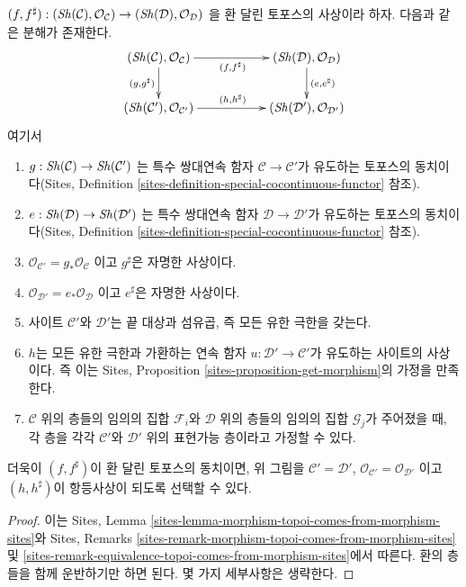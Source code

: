 \begin{lemma}
\label{lemma-morphism-ringed-topoi-comes-from-morphism-ringed-sites}
$(f, f^\sharp) :
(\mathop{\mathit{Sh}}\nolimits(\mathcal{C}), \mathcal{O}_\mathcal{C})
\to (\mathop{\mathit{Sh}}\nolimits(\mathcal{D}), \mathcal{O}_\mathcal{D})$
을 환 달린 토포스의 사상이라 하자. 다음과 같은 분해가 존재한다.
$$
\xymatrix{
(\Sh(\mathcal{C}), \mathcal{O}_\mathcal{C})
\ar[rr]_{(f, f^\sharp)}
\ar[d]_{(g, g^\sharp)}
& &
(\Sh(\mathcal{D}), \mathcal{O}_\mathcal{D}) \ar[d]^{(e, e^\sharp)}
\\
(\Sh(\mathcal{C}'), \mathcal{O}_{\mathcal{C}'})
\ar[rr]^{(h, h^\sharp)} & &
(\Sh(\mathcal{D}'), \mathcal{O}_{\mathcal{D}'})
}
$$
여기서
\begin{enumerate}
\item $g : \mathop{\mathit{Sh}}\nolimits(\mathcal{C}) \to \mathop{\mathit{Sh}}\nolimits(\mathcal{C}')$
는 특수 쌍대연속 함자 $\mathcal{C} \to \mathcal{C}'$가 유도하는 토포스의
동치이다(Sites, Definition
\ref{sites-definition-special-cocontinuous-functor} 참조).
\item $e : \mathop{\mathit{Sh}}\nolimits(\mathcal{D}) \to \mathop{\mathit{Sh}}\nolimits(\mathcal{D}')$
는 특수 쌍대연속 함자 $\mathcal{D} \to \mathcal{D}'$가 유도하는 토포스의
동치이다(Sites, Definition
\ref{sites-definition-special-cocontinuous-functor} 참조).
\item $\mathcal{O}_{\mathcal{C}'} = g_*\mathcal{O}_\mathcal{C}$
이고 $g^\sharp$은 자명한 사상이다.
\item $\mathcal{O}_{\mathcal{D}'} = e_*\mathcal{O}_\mathcal{D}$
이고 $e^\sharp$은 자명한 사상이다.
\item 사이트 $\mathcal{C}'$와 $\mathcal{D}'$는 끝 대상과 섬유곱, 즉 모든
유한 극한을 갖는다.
\item $h$는 모든 유한 극한과 가환하는 연속 함자
$u : \mathcal{D}' \to \mathcal{C}'$가 유도하는 사이트의 사상이다. 즉 이는
Sites, Proposition \ref{sites-proposition-get-morphism}의 가정을 만족한다.
\item $\mathcal{C}$ 위의 층들의 임의의 집합 $\mathcal{F}_i$와
$\mathcal{D}$ 위의 층들의 임의의 집합 $\mathcal{G}_j$가 주어졌을 때,
각 층을 각각 $\mathcal{C}'$와 $\mathcal{D}'$ 위의 표현가능 층이라고
가정할 수 있다.
\end{enumerate}
더욱이 $(f, f^\sharp)$이 환 달린 토포스의 동치이면, 위 그림을
$\mathcal{C}' = \mathcal{D}'$,
$\mathcal{O}_{\mathcal{C}'} = \mathcal{O}_{\mathcal{D}'}$
이고 $(h, h^\sharp)$이 항등사상이 되도록 선택할 수 있다.
\end{lemma}

\begin{proof}
이는 Sites, Lemma \ref{sites-lemma-morphism-topoi-comes-from-morphism-sites}와
Sites, Remarks \ref{sites-remark-morphism-topoi-comes-from-morphism-sites} 및
\ref{sites-remark-equivalence-topoi-comes-from-morphism-sites}에서 따른다.
환의 층들을 함께 운반하기만 하면 된다. 몇 가지 세부사항은 생략한다.
\end{proof}







